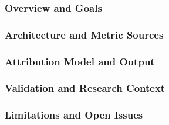 \subsubsection{Overview and Goals}
\label{sec:kepler-overview}
\subsubsection{Architecture and Metric Sources}
\label{sec:kepler-architecture}
\subsubsection{Attribution Model and Output}
\label{sec:kepler-attribution}
\subsubsection{Validation and Research Context}
\label{sec:kepler-validation}
\subsubsection{Limitations and Open Issues}
\label{sec:kepler-limitations}





